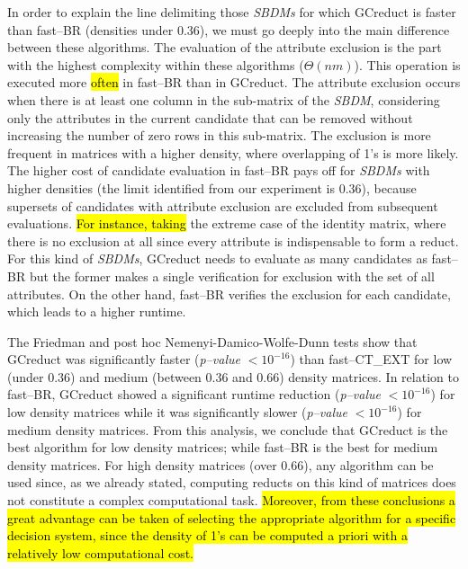 \documentclass[number,preprint,review,12pt]{elsarticle}
\begin{document}
	In order to explain the line delimiting those \textit{SBDMs} for which GCreduct is faster than fast--BR (densities under 0.36), we must go deeply into the main difference between these algorithms. The evaluation of the attribute exclusion is the part with the highest complexity within these algorithms ($\Theta (nm)$). This operation is executed more \hl{often} in fast--BR than in GCreduct. The attribute exclusion occurs when there is at least one column in the sub-matrix of the \textit{SBDM}, considering only the attributes in the current candidate that can be removed without increasing the number of zero rows in this sub-matrix. The exclusion is more frequent in matrices with a higher density, where overlapping of 1's is more likely. The higher cost of candidate evaluation in fast--BR pays off for \textit{SBDMs} with higher densities (the limit identified from our experiment is 0.36), because supersets of candidates with attribute exclusion are excluded from subsequent evaluations. \hl{For instance, taking} the extreme case of the identity matrix, where there is no exclusion at all since every attribute is indispensable to form a reduct. For this kind of \textit{SBDMs}, GCreduct needs to evaluate as many candidates as fast--BR but the former makes a single verification for exclusion with the set of all attributes. On the other hand, fast--BR verifies the exclusion for each candidate, which leads to a higher runtime.
	
	The Friedman and post hoc Nemenyi-Damico-Wolfe-Dunn tests show that GCreduct was significantly faster (\textit{p--value} $< 10^{-16}$) than fast--CT\_EXT for low (under 0.36) and medium (between 0.36 and 0.66) density matrices. In relation to fast--BR, GCreduct showed a significant runtime reduction (\textit{p--value} $< 10^{-16}$) for low density matrices while it was significantly slower (\textit{p--value} $< 10^{-16}$) for medium density matrices. From this analysis, we conclude that GCreduct is the best algorithm for low density matrices; while fast--BR is the best for medium density matrices. For high density matrices (over 0.66), any algorithm can be used since, as we already stated, computing reducts on this kind of matrices does not constitute a complex computational task. \hl{Moreover, from these conclusions a great advantage can be taken of selecting the appropriate algorithm for a specific decision system, since the density of 1's can be computed a priori with a relatively low computational cost.}
		
\end{document}
